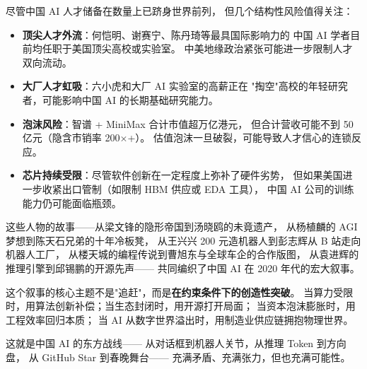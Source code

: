 \begin{warnbox}[中国 AI 人才面临的风险]
尽管中国 AI 人才储备在数量上已跻身世界前列，
但几个结构性风险值得关注：
\begin{itemize}[noitemsep]
  \item \textbf{顶尖人才外流}：何恺明、谢赛宁、陈丹琦等最具国际影响力的
        中国 AI 学者目前均任职于美国顶尖高校或实验室。
        中美地缘政治紧张可能进一步限制人才双向流动。
  \item \textbf{大厂人才虹吸}：六小虎和大厂 AI 实验室的高薪正在
        "掏空"高校的年轻研究者，可能影响中国 AI 的长期基础研究能力。
  \item \textbf{泡沫风险}：智谱 + MiniMax 合计市值超万亿港元，
        但合计营收可能不到 50 亿元（隐含市销率 200$\times$+）。
        估值泡沫一旦破裂，可能导致人才信心的连锁反应。
  \item \textbf{芯片持续受限}：尽管软件创新在一定程度上弥补了硬件劣势，
        但如果美国进一步收紧出口管制（如限制 HBM 供应或 EDA 工具），
        中国 AI 公司的训练能力仍可能面临瓶颈。
\end{itemize}
\end{warnbox}

这些人物的故事——从梁文锋的隐形帝国到汤晓鸥的未竟遗产，
从杨植麟的 AGI 梦想到陈天石兄弟的十年冷板凳，
从王兴兴 200 元造机器人到彭志辉从 B 站走向机器人工厂，
从楼天城的编程传说到曹旭东与全球车企的合作版图，
从袁进辉的推理引擎到邱锡鹏的开源先声——
共同编织了中国 AI 在 2020 年代的宏大叙事。

这个叙事的核心主题不是"追赶"，而是\textbf{在约束条件下的创造性突破}。
当算力受限时，用算法创新补偿；当生态封闭时，用开源打开局面；
当资本泡沫膨胀时，用工程效率回归本质；
当 AI 从数字世界溢出时，用制造业供应链拥抱物理世界。

这就是中国 AI 的东方战线——
从对话框到机器人关节，从推理 Token 到方向盘，
从 GitHub Star 到春晚舞台——
充满矛盾、充满张力，但也充满可能性。
